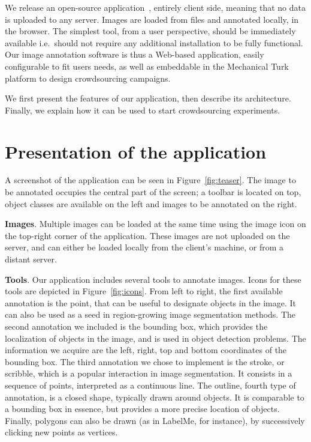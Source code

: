 We release an open-source application~\cite{annotationappgithub},
entirely client side, meaning that no data is uploaded to any server.
Images are loaded from files and annotated locally, in the browser.
The simplest tool, from a user perspective, should be immediately available
i.e.\ should not require any additional installation to be fully functional.
Our image annotation software is thus a Web-based application,
easily configurable to fit users needs, as well as
embeddable in the Mechanical Turk platform to design crowdsourcing campaigns.

We first present the features of our application, then describe its architecture.
Finally, we explain how it can be used to start crowdsourcing experiments.


\section{Presentation of the application}

A screenshot of the application can be seen in Figure~\ref{fig:teaser}.
The image to be annotated occupies the central part of the screen;
a toolbar is located on top, object classes are available on the left
and images to be annotated on the right.


\textbf{Images}.
Multiple images can be loaded at the same time using the image icon
on the top-right corner of the application.
These images are not uploaded on the server,
and can either be loaded locally from the client's machine,
or from a distant server.
% 
% 


\textbf{Tools}.
Our application includes several tools to annotate images.
Icons for these tools are depicted in Figure~\ref{fig:icons}.
From left to right, the first available annotation is the point,
that can be useful to designate objects in the image.
It can also be used as a seed in region-growing image segmentation methods.
The second annotation we included is the bounding box,
which provides the localization of objects in the image,
and is used in object detection problems.
The information we acquire are the left, right, top and bottom coordinates
of the bounding box.
The third annotation we chose to implement is the stroke,
or scribble, which is a popular interaction in image segmentation.
It consists in a sequence of points, interpreted as a continuous line.
The outline, fourth type of annotation,
is a closed shape, typically drawn around objects.
It is comparable to a bounding box in essence,
but provides a more precise location of objects.
Finally, polygons can also be drawn (as in LabelMe, for instance),
by successively clicking new points as vertices.


